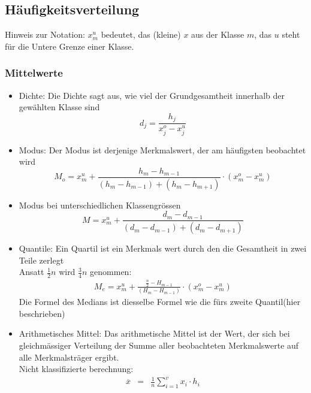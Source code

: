 \subsection{Häufigkeitsverteilung}
Hinweis zur Notation: $x_m^u$ bedeutet, das (kleine) $x$ aus der Klasse $m$, das $u$ steht für die Untere Grenze einer Klasse. 
\subsubsection{Mittelwerte}
\begin{itemize}
	\item Dichte: Die Dichte sagt aus, wie viel der Grundgesamtheit innerhalb der gewählten Klasse sind
	\begin{equation}\label{theorie:mittelwerte:dicht}
	d_j = \frac{h_j}{x_j^o-x_j^u}
	\end{equation}
	\item Modus: Der Modus ist derjenige Merkmalswert, der am häufigsten beobachtet wird %
	\begin{equation}\label{theorie:mittelwerte:modus:1}
	M_{o}=x_{m}^{u}+\frac{h_{m}-h_{m-1}}{(h_{m}-h_{m-1})+(h_{m}-h_{m+1})}\cdot(x_{m}^{o}-x_{m}^{u})
	\end{equation}
	\item Modus bei unterschiedlichen Klassengrössen
	\begin{equation}\label{theorie:mittelwerte:modus:2}
	M = x_m^u + \frac{d_m-d_{m-1}}{(d_m-d_{m-1})+(d_m-d_{m+1})}
	\end{equation}
	\item Quantile: Ein Quartil ist ein Merkmals wert durch den die Gesamtheit in zwei Teile zerlegt\\
	Ansatt $\frac{1}{2} n$ wird $\frac{3}{4} n$ genommen:\\
	\begin{eqnarray}\label{theorie:mittelwerte:quant}
	M_{e}=x_{m}^{u}+\frac{\frac{n}{2}-H_{m-1}}{(H_{m}-H_{m-1})}\cdot(x_{m}^{o}-x_{m}^{u})
	\end{eqnarray}
	Die Formel des Medians ist diesselbe Formel wie die fürs zweite Quantil(hier beschrieben)
	\item Arithmetisches Mittel: Das arithmetische Mittel ist der Wert, der sich bei gleichmässiger Verteilung der Summe aller beobachteten Merkmalswerte auf alle Merkmalsträger ergibt.\\
	Nicht klassifizierte berechnung:
	\begin{eqnarray} \label{theorie:mittelwerte:arith}
	\overline{x}&=&\frac{1}{n}\sum_{i=1}^{v}x_i\cdot h_i\\

\end{eqnarray}
\end{itemize}
